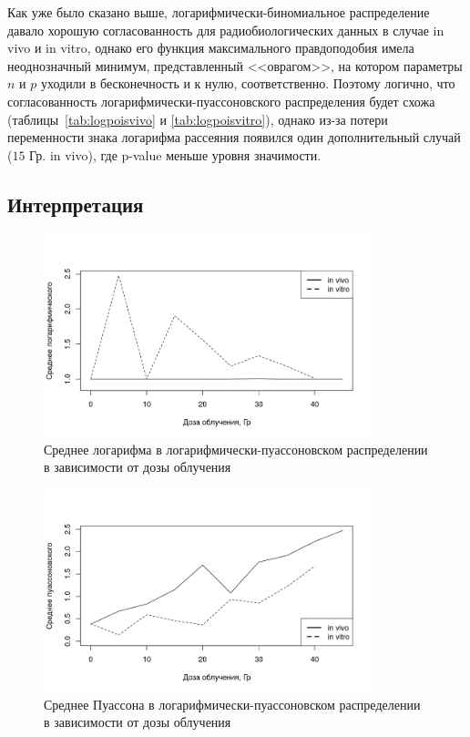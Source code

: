 \documentclass[12pt, specialist, subf, substylefile = spbu_report.rtx]{disser}
\begin{document}
	Как уже было сказано выше, логарифмически-биномиальное распределение давало хорошую согласованность для радиобиологических данных в случае in vivo и in vitro, однако его функция максимального правдоподобия имела неоднозначный минимум, представленный <<оврагом>>, на котором параметры $n$ и $p$ уходили в бесконечность и к нулю, соответственно. Поэтому логично, что согласованность логарифмически-пуассоновского распределения будет схожа (таблицы~\ref{tab:logpoisvivo} и \ref{tab:logpoisvitro}), однако из-за потери переменности знака логарифма рассеяния появился один дополнительный случай ($15$ Гр. in vivo), где p-value меньше уровня значимости.

	\subsection{Интерпретация}
	
	\begin{figure}[!ht]
		\centering
		\includegraphics[width = 0.85\textwidth]{logpoismeanlog}
		\caption{Среднее логарифма в логарифмически-пуассоновском распределении в зависимости от дозы облучения}
		\label{img:logpoismeanlog}
	\end{figure}
	
	\begin{figure}[!ht]
		\centering
		\includegraphics[width = 0.85\textwidth]{logpoismeanpois}
		\caption{Среднее Пуассона в логарифмически-пуассоновском распределении в зависимости от дозы облучения}
		\label{img:logpoismeanpois}
	\end{figure}
\end{document}
